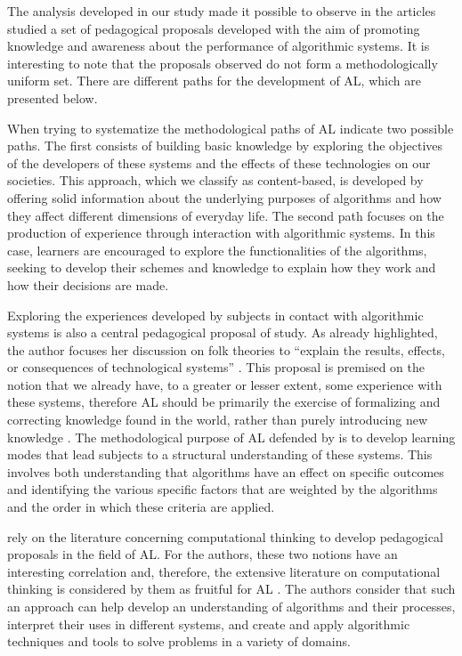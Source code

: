 The analysis developed in our study made it possible to observe in the articles studied a set of pedagogical proposals developed with the aim of promoting knowledge and awareness about the performance of algorithmic systems. It is interesting to note that the proposals observed do not form a methodologically uniform set. There are different paths for the development of AL, which are presented below.

When trying to systematize the methodological paths of AL \textcite{Silva2022} indicate two possible paths. The first consists of building basic knowledge by exploring the objectives of the developers of these systems and the effects of these technologies on our societies. This approach, which we classify as content-based, is developed by offering solid information about the underlying purposes of algorithms and how they affect different dimensions of everyday life. The second path focuses on the production of experience through interaction with algorithmic systems. In this case, learners are encouraged to explore the functionalities of the algorithms, seeking to develop their schemes and knowledge to explain how they work and how their decisions are made.

Exploring the experiences developed by subjects in contact with algorithmic systems is also a central pedagogical proposal of  study. As already highlighted, the author focuses her discussion on folk theories to “explain the results, effects, or consequences of technological systems” \cite[p. 4]{Devito2021}. This proposal is premised on the notion that we already have, to a greater or lesser extent, some experience with these systems, therefore AL should be primarily the exercise of formalizing and correcting knowledge found in the world, rather than purely introducing new knowledge \cite{Devito2021}. The methodological purpose of AL defended by \textcite{Devito2021} is to develop learning modes that lead subjects to a structural understanding of these systems. This involves both understanding that algorithms have an effect on specific outcomes and identifying the various specific factors that are weighted by the algorithms and the order in which these criteria are applied.

\textcite{Ridley2021} rely on the literature concerning computational thinking to develop pedagogical proposals in the field of AL. For the authors, these two notions have an interesting correlation and, therefore, the extensive literature on computational thinking is considered by them as fruitful for AL \cite{Ridley2021}. The authors consider that such an approach can help develop an understanding of algorithms and their processes, interpret their uses in different systems, and create and apply algorithmic techniques and tools to solve problems in a variety of domains.

